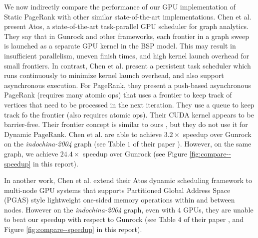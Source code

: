 We now indirectly compare the performance of our GPU implementation of Static PageRank with other similar state-of-the-art implementations. Chen et al. \cite{chen2022atos} present Atos, a state-of-the-art task-parallel GPU scheduler for graph analytics. They say that in Gunrock and other frameworks, each frontier in a graph sweep is launched as a separate GPU kernel in the BSP model. This may result in insufficient parallelism, uneven finish times, and high kernel launch overhead for small frontiers. In contrast, Chen et al. present a persistent task scheduler which runs continuously to minimize kernel launch overhead, and also support asynchronous execution. For PageRank, they present a push-based asynchronous PageRank (requires many atomic ops) that uses a frontier to keep track of vertices that need to be processed in the next iteration. They use a queue to keep track fo the frontier (also requires atomic ops). Their CUDA kernel appears to be barrier-free. Their frontier concept is similar to ours \cite{sahu2024df}, but they do not use it for Dynamic PageRank. Chen et al. are able to achieve $3.2\times$ speedup over Gunrock on the \textit{indochina-2004} graph (see Table $1$ of their paper \cite{chen2022atos}). However, on the same graph, we achieve $24.4\times$ speedup over Gunrock (see Figure \ref{fig:compare--speedup} in this report).

In another work, Chen et al. \cite{chen2022scalable} extend their Atos dynamic scheduling framework to multi-node GPU systems that supports Partitioned Global Address Space (PGAS) style lightweight one-sided memory operations within and between nodes. However on the \textit{indochina-2004} graph, even with $4$ GPUs, they are unable to beat our speedup with respect to Gunrock (see Table $4$ of their paper \cite{chen2022scalable}, and Figure \ref{fig:compare--speedup} in this report).

